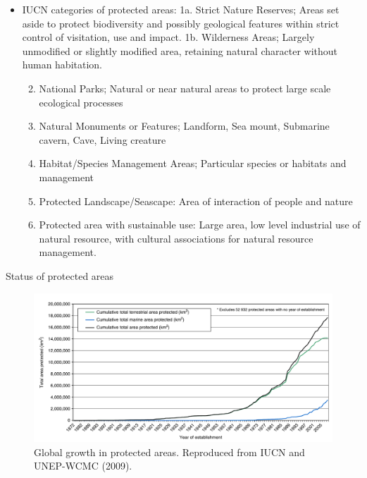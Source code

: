 \documentclass[ignorenonframetext,aspectratio=169]{beamer}
\providecommand{\tightlist}{%
  \setlength{\itemsep}{0pt}\setlength{\parskip}{0pt}}
\begin{document}
\begin{frame}{}
\protect\hypertarget{section-1}{}

\begin{itemize}
\tightlist
\item
  IUCN categories of protected areas: 1a. Strict Nature Reserves; Areas
  set aside to protect biodiversity and possibly geological features
  within strict control of visitation, use and impact. 1b. Wilderness
  Areas; Largely unmodified or slightly modified area, retaining natural
  character without human habitation.

  \begin{enumerate}
  \setcounter{enumi}{1}
  \tightlist
  \item
    National Parks; Natural or near natural areas to protect large scale
    ecological processes
  \item
    Natural Monuments or Features; Landform, Sea mount, Submarine
    cavern, Cave, Living creature
  \item
    Habitat/Species Management Areas; Particular species or habitats and
    management
  \item
    Protected Landscape/Seascape: Area of interaction of people and
    nature
  \item
    Protected area with sustainable use: Large area, low level
    industrial use of natural resource, with cultural associations for
    natural resource management.
  \end{enumerate}
\end{itemize}

\end{frame}

\begin{frame}{Status of protected areas}
\protect\hypertarget{status-of-protected-areas}{}

\begin{figure}
\includegraphics[width=0.65\linewidth]{./../images/global_protected_area} \caption{Global growth in protected areas. Reproduced from IUCN and UNEP-WCMC (2009).}\label{fig:global}
\end{figure}

\end{frame}
\end{document}
